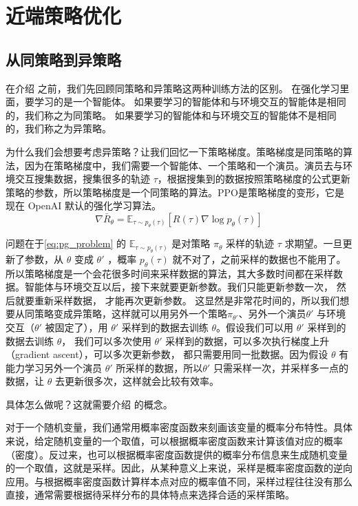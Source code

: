 \section{近端策略优化}
\subsection{从同策略到异策略}
在介绍 之前，我们先回顾同策略和异策略这两种训练方法的区别。
在强化学习里面，要学习的是一个智能体。
如果要学习的智能体和与环境交互的智能体是相同的，我们称之为同策略。 
如果要学习的智能体和与环境交互的智能体不是相同的，我们称之为异策略。

为什么我们会想要考虑异策略？让我们回忆一下策略梯度。策略梯度是同策略的算法，因为在策略梯度中，我们需要一个智能体、一个策略和一个演员。演员去与环境交互搜集数据，搜集很多的轨迹 $\tau$，根据搜集到的数据按照策略梯度的公式更新策略的参数，所以策略梯度是一个同策略的算法。PPO是策略梯度的变形，它是现在 OpenAI 默认的强化学习算法。
\begin{equation}
    \nabla \bar{R}_{\theta}=\mathbb{E}_{\tau \sim p_{\theta}(\tau)}\left[R(\tau) \nabla \log p_{\theta}(\tau)\right]
    \label{eq:pg_problem}
\end{equation}

问题在于\eqref{eq:pg_problem} 的 $\mathbb{E}_{\tau \sim p_{\theta}(\tau)}$ 是对策略 $\pi_{\theta}$ 采样的轨迹 $\tau$ 求期望。一旦更新了参数，从 $\theta$ 变成 $\theta'$ ，概率 $p_\theta(\tau)$ 就不对了，之前采样的数据也不能用了。所以策略梯度是一个会花很多时间来采样数据的算法，其大多数时间都在采样数据。智能体与环境交互以后，接下来就要更新参数。我们只能更新参数一次，
然后就要重新采样数据， 才能再次更新参数。
这显然是非常花时间的，所以我们想要从同策略变成异策略，这样就可以用另外一个策略$\pi_{\theta'}$、另外一个演员$\theta'$ 与环境交互（$\theta'$ 被固定了），用 $\theta'$ 采样到的数据去训练 $\theta$。假设我们可以用 $\theta'$ 采样到的数据去训练 $\theta$，
我们可以多次使用 $\theta'$ 采样到的数据，可以多次执行梯度上升（gradient ascent），可以多次更新参数， 都只需要用同一批数据。因为假设 $\theta$ 有能力学习另外一个演员 $\theta'$ 所采样的数据，所以$\theta'$ 只需采样一次，并采样多一点的数据，让 $\theta$ 去更新很多次，这样就会比较有效率。

具体怎么做呢？这就需要介绍 的概念。
\begin{tcolorbox}[colframe=blue!25,colback=blue!10]
对于一个随机变量，我们通常用概率密度函数来刻画该变量的概率分布特性。具体来说，给定随机变量的一个取值，可以根据概率密度函数来计算该值对应的概率（密度）。反过来，也可以根据概率密度函数提供的概率分布信息来生成随机变量的一个取值，这就是采样。因此，从某种意义上来说，采样是概率密度函数的逆向应用。与根据概率密度函数计算样本点对应的概率值不同，采样过程往往没有那么直接，通常需要根据待采样分布的具体特点来选择合适的采样策略。
\end{tcolorbox}

